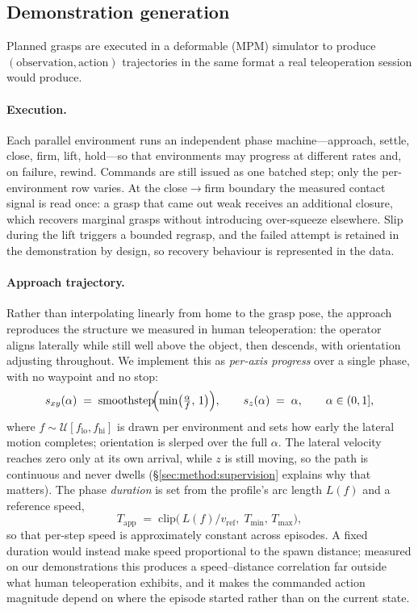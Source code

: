 \subsection{Demonstration generation}
\label{sec:method:demos}

Planned grasps are executed in a deformable (MPM) simulator to produce
$(\text{observation},\text{action})$ trajectories in the same format a real teleoperation
session would produce.

\paragraph{Execution.}
Each parallel environment runs an independent phase machine---approach, settle, close,
firm, lift, hold---so that environments may progress at different rates and, on failure,
rewind. Commands are still issued as one batched step; only the per-environment row varies.
At the close$\rightarrow$firm boundary the measured contact signal is read once: a grasp that
came out weak receives an additional closure, which recovers marginal grasps without
introducing over-squeeze elsewhere. Slip during the lift triggers a bounded regrasp, and the
failed attempt is retained in the demonstration by design, so recovery behaviour is
represented in the data.

\paragraph{Approach trajectory.}
Rather than interpolating linearly from home to the grasp pose, the approach reproduces the
structure we measured in human teleoperation: the operator aligns laterally while still well
above the object, then descends, with orientation adjusting throughout. We implement this as
\emph{per-axis progress} over a single phase, with no waypoint and no stop:
\begin{equation}
  s_{xy}(\alpha) \;=\; \mathrm{smoothstep}\!\Bigl(\min\bigl(\tfrac{\alpha}{f},\,1\bigr)\Bigr),
  \qquad
  s_{z}(\alpha) \;=\; \alpha ,
  \qquad \alpha \in (0,1],
  \label{eq:approach}
\end{equation}
where $f\!\sim\!\mathcal{U}[f_{\text{lo}},f_{\text{hi}}]$ is drawn per environment and sets
how early the lateral motion completes; orientation is slerped over the full $\alpha$. The
lateral velocity reaches zero only at its own arrival, while $z$ is still moving, so the path
is continuous and never dwells (\S\ref{sec:method:supervision} explains why that matters).
The phase \emph{duration} is set from the profile's arc length $L(f)$ and a reference speed,
\begin{equation}
  T_{\text{app}} \;=\; \mathrm{clip}\bigl(\,L(f)/v_{\text{ref}},\; T_{\min},\, T_{\max}\bigr),
  \label{eq:duration}
\end{equation}
so that per-step speed is approximately constant across episodes. A fixed duration would
instead make speed proportional to the spawn distance; measured on our demonstrations this
produces a speed--distance correlation far outside what human teleoperation exhibits, and it
makes the commanded action magnitude depend on where the episode started rather than on the
current state.

